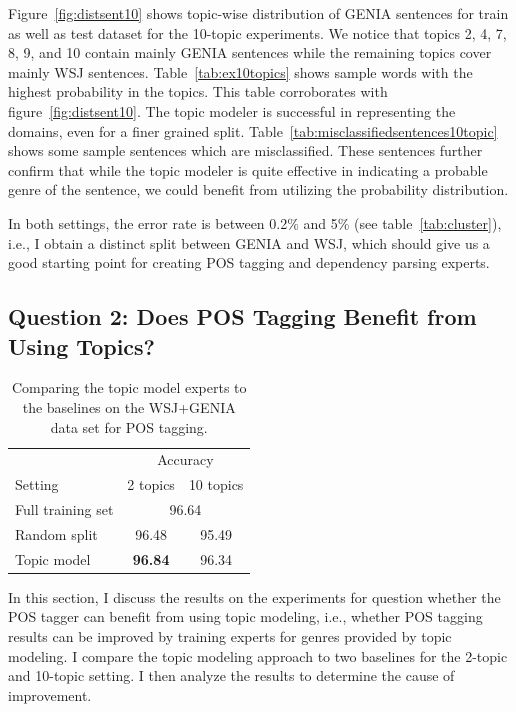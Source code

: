 Figure~\ref{fig:distsent10} shows topic-wise distribution of GENIA sentences for train as well as test dataset for the 10-topic experiments. We notice that topics 2, 4, 7, 8, 9, and 10 contain mainly GENIA sentences while the remaining topics cover mainly WSJ sentences. Table~\ref{tab:ex10topics} shows sample words with the highest probability in the topics. This table corroborates with figure~\ref{fig:distsent10}. The topic modeler is successful in representing the domains, even for a finer grained split. Table~\ref{tab:misclassifiedsentences10topic} shows some sample sentences which are misclassified. These sentences further confirm that while the topic modeler is quite effective in indicating a probable genre of the sentence, we could benefit from utilizing the probability distribution. 

In both settings, the error rate is between 0.2\% and 5\% (see table~\ref{tab:cluster}), i.e., I obtain a distinct split between GENIA and WSJ, which should give us a good starting point for creating POS tagging and dependency parsing experts. 




\subsection{Question 2: Does POS Tagging Benefit from Using Topics?}

\begin{table}[t]
\centering
\begin{tabular}{l|cc}
 & \multicolumn{2}{c}{Accuracy} \\
Setting & \multicolumn{1}{r}{2 topics} & \multicolumn{1}{r}{10 topics} \\ \hline
Full training set & \multicolumn{2}{c}{96.64} \\
Random split & 96.48 & 95.49 \\
Topic model & \textbf{96.84} & 96.34 \\ \hline
\end{tabular}
\caption{Comparing the topic model experts to the baselines on the WSJ+GENIA data set for POS tagging.\label{tab:mixedresults}}
\end{table}


In this section, I discuss the results on the experiments for question whether the POS tagger can benefit from using topic modeling, i.e., whether POS tagging results can be improved by training experts for genres provided by topic modeling. I compare the topic modeling approach to  two baselines for the 2-topic and 10-topic setting. I then analyze the results to determine the cause of improvement.

